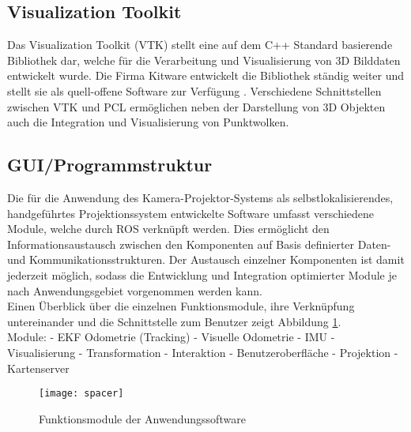 \subsection{Visualization Toolkit}
Das Visualization Toolkit (VTK) stellt eine auf dem C++ Standard basierende Bibliothek dar, welche für die Verarbeitung und Visualisierung von 3D Bilddaten entwickelt wurde. Die Firma Kitware entwickelt die Bibliothek ständig weiter und stellt sie als quell-offene Software zur Verfügung \cite{VTK}. Verschiedene Schnittstellen zwischen VTK und PCL ermöglichen neben der Darstellung von 3D Objekten auch die Integration und Visualisierung von Punktwolken.

\subsection{GUI/Programmstruktur}
Die für die Anwendung des Kamera-Projektor-Systems als selbstlokalisierendes, handgeführtes Projektionssystem entwickelte Software umfasst verschiedene Module, welche durch ROS verknüpft werden. Dies ermöglicht den Informationsaustausch zwischen den Komponenten auf Basis definierter Daten- und Kommunikationsstrukturen. Der Austausch einzelner Komponenten ist damit jederzeit möglich, sodass die Entwicklung und Integration optimierter Module je nach Anwendungsgebiet vorgenommen werden kann.\\
Einen Überblick über die einzelnen Funktionsmodule, ihre Verknüpfung untereinander und die Schnittstelle zum Benutzer zeigt Abbildung \ref{fig.modules}.\\

Module: \mLocalization - EKF Odometrie (Tracking) - Visuelle Odometrie - IMU - Visualisierung - Transformation - Interaktion - Benutzeroberfläche - Projektion - Kartenserver

\begin{figure}[ht]
	\begin{center}
		\texttt{[image: spacer]}
		\caption{Funktionsmodule der Anwendungssoftware}
		\label{fig.modules}
	\end{center}
\end{figure}

